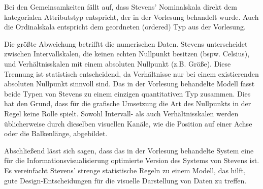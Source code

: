 \documentclass[10pt, a4paper]{article}
\begin{document}
Bei den Gemeinsamkeiten fällt auf, dass Stevens' Nominalskala direkt dem kategorialen Attributstyp entspricht, der in der Vorlesung behandelt wurde. 
Auch die Ordinalskala entspricht dem geordneten (ordered) Typ aus der Vorlesung.

Die größte Abweichung betrifftt die numerischen Daten. Stevens unterscheidet zwischen Intervallskalen, die keinen echten Nullpunkt besitzen (bspw. Celsius), 
und Verhältnisskalen mit einem absoluten Nullpunkt (z.B. Größe). 
Diese Trennung ist statistisch entscheidend, da Verhältnisse nur bei einem existierenden absoluten Nullpunkt sinnvoll sind. 
Das in der Vorlesung behandelte Modell fasst beide Typen von Stevens zu einem einzigen quantitativen Typ zusammen. 
Dies hat den Grund, dass für die grafische Umsetzung die Art des Nullpunkts in der Regel keine Rolle spielt. 
Sowohl Intervall- als auch Verhältnisskalen werden üblicherweise durch dieselben visuellen Kanäle, wie die Position auf einer Achse oder die Balkenlänge, abgebildet.

Abschließend lässt sich sagen, dass das in der Vorlesung behandelte System eine für die Informationsvisualisierung optimierte Version des Systems von Stevens ist. 
Es vereinfacht Stevens’ strenge statistische Regeln zu einem Modell, das hilft, gute Design-Entscheidungen für die visuelle Darstellung von Daten zu treffen.
\end{document}
